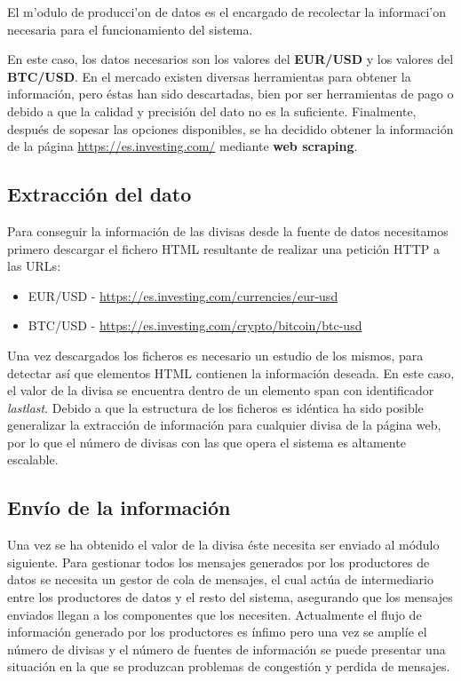 El m'odulo de producci'on de datos es el encargado de recolectar la informaci'on necesaria para el funcionamiento del sistema.

En este caso, los datos necesarios son los valores del \textbf{EUR/USD} y los valores del \textbf{BTC/USD}.
En el mercado existen diversas herramientas para obtener la información, pero éstas han sido descartadas, bien por ser herramientas de pago o debido a que la calidad y precisión del dato no es la suficiente. Finalmente, después de sopesar las opciones disponibles, se ha decidido obtener la información de la página \url{https://es.investing.com/} mediante \textbf{web scraping}. 

\subsection{Extracción del dato}
Para conseguir la información de las divisas desde la fuente de datos necesitamos primero descargar el fichero HTML resultante de realizar una petición HTTP a las URLs: 
\begin{itemize}
\item EUR/USD - \url{https://es.investing.com/currencies/eur-usd}
\item BTC/USD - \url{https://es.investing.com/crypto/bitcoin/btc-usd}
\end{itemize}


Una vez descargados los ficheros es necesario un estudio de los mismos, para detectar así que elementos HTML contienen la información deseada. En este caso, el valor de la divisa se encuentra dentro de un elemento span con identificador \textit{last\textunderscore last}. Debido a que la estructura de los ficheros es idéntica ha sido posible generalizar la extracción de información para cualquier divisa de la página web, por lo que el número de divisas con las que opera el sistema es altamente escalable.

\subsection{Envío de la información}
Una vez se ha obtenido el valor de la divisa éste necesita ser enviado al módulo siguiente. Para gestionar todos los mensajes generados por los productores de datos se necesita un gestor de cola de mensajes, el cual actúa de intermediario entre los productores de datos y el resto del sistema, asegurando que los mensajes enviados llegan a los componentes que los necesiten. 
Actualmente el flujo de información generado por los productores es ínfimo pero una vez se amplíe el número de divisas y el número de fuentes de información se puede presentar una situación en la que se produzcan problemas de congestión y perdida de mensajes.

